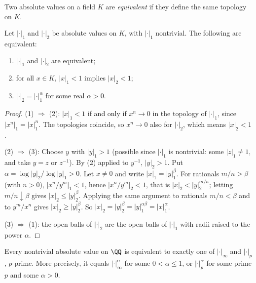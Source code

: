 \begin{definition}\label{p-adic-numbers:definition-equivalent}
Two absolute values on a field $K$ are \emph{equivalent} if they define the same topology on $K$.
\end{definition}

\begin{proposition}\label{p-adic-numbers:proposition-equivalent}
Let $|\cdot|_1$ and $|\cdot|_2$ be absolute values on $K$, with $|\cdot|_1$ nontrivial. The following are equivalent:
\begin{enumerate}
\item $|\cdot|_1$ and $|\cdot|_2$ are equivalent;
\item for all $x \in K$, $|x|_1 < 1$ implies $|x|_2 < 1$;
\item $|\cdot|_2 = |\cdot|_1^\alpha$ for some real $\alpha > 0$.
\end{enumerate}
\end{proposition}

\begin{proof}
(1) $\Rightarrow$ (2): $|x|_1 < 1$ if and only if $x^n \to 0$ in the topology of $|\cdot|_1$, since $|x^n|_1 = |x|_1^n$. The topologies coincide, so $x^n \to 0$ also for $|\cdot|_2$, which means
$|x|_2 < 1$.

(2) $\Rightarrow$ (3): Choose $y$ with $|y|_1 > 1$ (possible since $|\cdot|_1$ is nontrivial: some $|z|_1 \neq 1$, and take $y = z$ or $z^{-1}$). By (2) applied to $y^{-1}$, $|y|_2 > 1$. Put
$\alpha = \log|y|_2/\log|y|_1 > 0$. Let $x \neq 0$ and write $|x|_1 = |y|_1^\beta$. For rationals $m/n > \beta$ (with $n > 0$), $|x^n/y^m|_1 < 1$, hence $|x^n/y^m|_2 < 1$, that is
$|x|_2 < |y|_2^{m/n}$; letting $m/n \downarrow \beta$ gives $|x|_2 \leq |y|_2^\beta$. Applying the same argument to rationals $m/n < \beta$ and to $y^m/x^n$ gives $|x|_2 \geq |y|_2^\beta$. So
$|x|_2 = |y|_2^\beta = |y|_1^{\alpha\beta} = |x|_1^\alpha$.

(3) $\Rightarrow$ (1): the open balls of $|\cdot|_2$ are the open balls of $|\cdot|_1$ with radii raised to the power $\alpha$.
\end{proof}

\begin{theorem}[Ostrowski]\label{p-adic-numbers:theorem-ostrowski}
Every nontrivial absolute value on $\QQ$ is equivalent to exactly one of $|\cdot|_\infty$ and $|\cdot|_p$, $p$ prime. More precisely, it equals $|\cdot|_\infty^\alpha$ for some $0 < \alpha \leq 1$, or
$|\cdot|_p^\alpha$ for some prime $p$ and some $\alpha > 0$.
\end{theorem}

